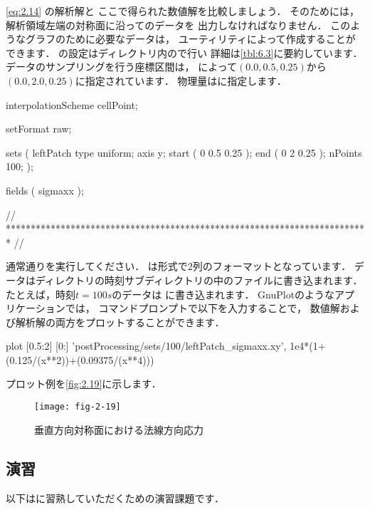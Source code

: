 \autoref{eq:2.14} の解析解と
ここで得られた数値解を比較しましょう．
そのためには，解析領域左端の対称面に沿ってのデータを
出力しなければなりません．
このようなグラフのために必要なデータは，
ユーティリティによって作成することができます．
の設定はディレクトリ内ので行い
詳細は\autoref{tbl:6.3}に要約しています．
データのサンプリングを行う座標区間は，
によって$(0.0, 0.5, 0.25)$から$(0.0, 2.0, 0.25)$に指定されています．
物理量はに指定します．
\begin{OFverbatim}[file, linenum=17]

interpolationScheme cellPoint;

setFormat       raw;

sets
(
    leftPatch
    {
        type    uniform;
        axis    y;
        start   ( 0 0.5 0.25 );
        end     ( 0 2 0.25 );
        nPoints 100;
    }
);

fields          ( sigmaxx );


// ************************************************************************* //
\end{OFverbatim}
通常通りを実行してください．
%
%
は形式で2列のフォーマットとなっています．
データはディレクトリの時刻サブディレクトリの中のファイルに書き込まれます．
たとえば，時刻$t = 100\unit{s}$のデータは
に書き込まれます．
GnuPlotのようなアプリケーションでは，
コマンドプロンプトで以下を入力することで，
数値解および解析解の両方をプロットすることができます．
\begin{OFverbatim}[terminal]
plot [0.5:2] [0:] 'postProcessing/sets/100/leftPatch_sigmaxx.xy',
     1e4*(1+(0.125/(x**2))+(0.09375/(x**4)))
\end{OFverbatim}
プロット例を\autoref{fig:2.19}に示します．


\begin{figure}[ht]
 \texttt{[image: fig-2-19]}
 \caption{垂直方向対称面における法線方向応力}
 \label{fig:2.19}
\end{figure}


\subsection{演習}
\label{ssec:2.2.4}
以下はに習熟していただくための演習課題です．

